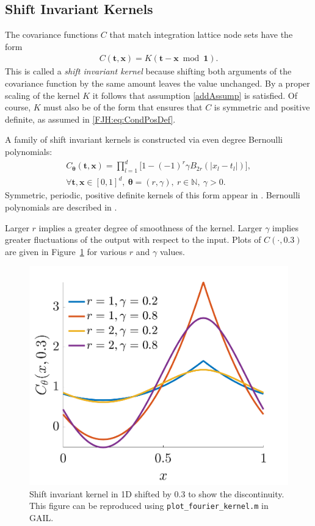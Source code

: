 \documentclass[twocolumn]{svjour3}          %
\newcommand{\bm}[1]{\boldsymbol{#1}}
\newcommand{\naturals}{\mathbb{N}}
\newcommand{\vtheta}{{\bm{\theta}}}
\newcommand{\vt}{\bm{t}}
\newcommand{\vx}{\bm{x}}
\newcommand{\vone}{\bm{1}}
\newcommand{\code}[1]{\texttt{#1}}
\newcommand\figref{Figure~\ref}
\begin{document}
\subsection{Shift Invariant Kernels}
The covariance functions $C$ that match integration lattice node sets have the form
\begin{align} \label{eq:shInv}
C(\vt,\vx) = K(\vt - \vx \bmod \vone).
\end{align}
This is called a \emph{shift invariant kernel} because shifting both arguments of the covariance function by the same amount leaves the value unchanged.   By a proper scaling of the kernel $K$ it follows that assumption \eqref{addAssump} is satisfied. Of course, $K$ must also be of the form that ensures that $C$ is symmetric and positive definite, as assumed in \eqref{FJH:eq:CondPosDef}. 

A family of shift invariant kernels is constructed via even degree Bernoulli polynomials:
\begin{multline}
\label{the_kernel_eqn_bernoulli}
C_\vtheta(\vt, \vx) =
\prod_{l=1}^d \biggl[
1 - (-1)^{r} \gamma B_{2r}( |{x_l-t_l}| ) \biggr], \\  
\forall \vt,\vx \in [0,1]^d, \  \vtheta = (r,\gamma), \ r \in \naturals, \ \gamma > 0.
\end{multline}
Symmetric, periodic, positive definite kernels of this form appear in  \cite{DicEtal14a,Hic96a}.  Bernoulli polynomials are described in \cite[Chapter 24]{OlvEtal10a}.

Larger $r$ implies a greater degree of smoothness of the kernel.  Larger $\gamma$ implies greater fluctuations of the output with respect to the input.  Plots of $C(\cdot, 0.3)$ are given in \figref{fig:fourierkernel-dim1} for various $r$ and $\gamma$ values.

\begin{figure}
	\centering
	\includegraphics[width=0.9\linewidth]{"figures/fourier_kernel dim_1"}
	\caption[Fourier kernel]{Shift invariant kernel in 1D shifted by 0.3 to show the discontinuity. This figure can be reproduced using \code{plot\_fourier\_kernel.m} in GAIL. }
	\label{fig:fourierkernel-dim1}
\end{figure}
\end{document}
